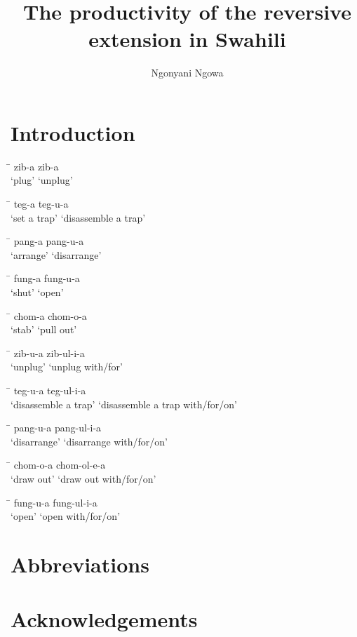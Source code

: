 \documentclass[output=paper]{langsci/langscibook}
\title{The productivity of the reversive extension in Swahili}
\author{%
 Ngonyani\affiliation{}\lastand 
 Ngowa \affiliation{}
}
\begin{document}
\section{Introduction} 
\newcommand{\tabme}[5][4cm]{%
  \begin{tabbing}
    \hspace{#1} \= \hspace{#1} \kill
    #2	\>		#3 \\
    #4	\>		#5 \\
  \end{tabbing}
}

\ea
\ea
\tabme{zib-a}{zib-a}{‘plug’}{‘unplug’}
\ex
\tabme{teg-a}{teg-u-a }{‘set a trap’}{‘disassemble a trap’}
\ex
\tabme{pang-a}{pang-u-a }{‘arrange’}{‘disarrange’}
\ex
\tabme{fung-a}{fung-u-a}{‘shut’ }{‘open’} 
\ex
\tabme{chom-a}{chom-o-a}{‘stab’}{‘pull out’}
\z
\z
 
\ea
\ea 
\tabme[2cm]{zib-u-a}{zib-ul-i-a}{‘unplug’}{‘unplug with/for’}
\ex
\tabme[5cm]{teg-u-a}{teg-ul-i-a}{‘disassemble a trap’}{‘disassemble a trap with/for/on’}
\ex
\tabme[4cm]{pang-u-a}{pang-ul-i-a}{‘disarrange’}{‘disarrange with/for/on’}
\ex
\tabme[5cm]{chom-o-a}{chom-ol-e-a}{‘draw out’}{‘draw out with/for/on’}
\ex
\tabme[3cm]{fung-u-a}{fung-ul-i-a}{‘open’}{‘open with/for/on’}
\z
\z


\section*{Abbreviations}
\section*{Acknowledgements}

\printbibliography[heading=subbibliography,notkeyword=this]
\end{document}
